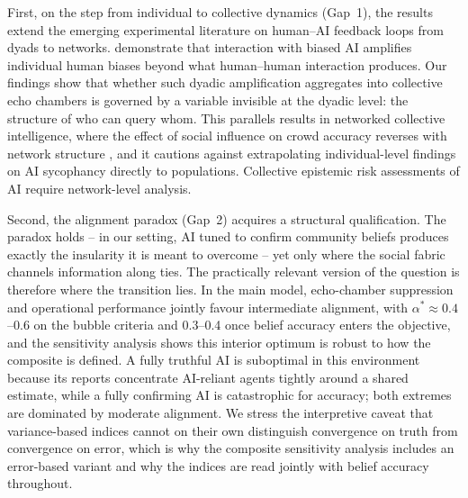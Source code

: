 \documentclass[sn-apacite]{sn-jnl}
\begin{document}
First, on the step from individual to collective dynamics (Gap~1), the results extend the emerging experimental literature on human--AI feedback loops from dyads to networks. \citet{glickman2024human} demonstrate that interaction with biased AI amplifies individual human biases beyond what human--human interaction produces. Our findings show that whether such dyadic amplification aggregates into collective echo chambers is governed by a variable invisible at the dyadic level: the structure of who can query whom. This parallels results in networked collective intelligence, where the effect of social influence on crowd accuracy reverses with network structure \citep{lorenz2011social,becker2017network}, and it cautions against extrapolating individual-level findings on AI sycophancy \citep{sharma2024generative} directly to populations. Collective epistemic risk assessments of AI require network-level analysis.

Second, the alignment paradox (Gap~2) \citep{west2025alignment} acquires a structural qualification. The paradox holds -- in our setting, AI tuned to confirm community beliefs produces exactly the insularity it is meant to overcome -- yet only where the social fabric channels information along ties. The practically relevant version of the question is therefore where the transition lies. In the main model, echo-chamber suppression and operational performance jointly favour intermediate alignment, with $\alpha^{*} \approx 0.4$--$0.6$ on the bubble criteria and 0.3--0.4 once belief accuracy enters the objective, and the sensitivity analysis shows this interior optimum is robust to how the composite is defined. A fully truthful AI is suboptimal in this environment because its reports concentrate AI-reliant agents tightly around a shared estimate, while a fully confirming AI is catastrophic for accuracy; both extremes are dominated by moderate alignment. We stress the interpretive caveat that variance-based indices cannot on their own distinguish convergence on truth from convergence on error, which is why the composite sensitivity analysis includes an error-based variant and why the indices are read jointly with belief accuracy throughout.
\end{document}
